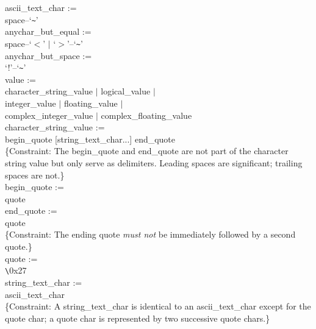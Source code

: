 \documentclass[onecolumn]{aa}
\begin{document}
ascii\_text\_char :=  \\ \null \hspace{0.5in}
	space--`\verb+~+' \\

anychar\_but\_equal :=  \\ \null \hspace{0.5in}
	space--`$<$' $|$ `$>$'--`\verb+~+' \\

anychar\_but\_space :=  \\ \null \hspace{0.5in}
	`!'--`\verb+~+' \\

value :=   \\ \null \hspace{0.5in}
	character\_string\_value $|$ logical\_value $|$ \\ \null \hspace{0.5in}
	integer\_value $|$ floating\_value $|$ \\ \null \hspace{0.5in}
	complex\_integer\_value $|$ complex\_floating\_value \\

character\_string\_value :=   \\ \null \hspace{0.5in}
	begin\_quote [string\_text\_char...] end\_quote \\
\{Constraint: The begin\_quote and end\_quote are not part of the
character string value but only serve as delimiters.  Leading spaces are
significant; trailing spaces are not.\} \\

begin\_quote :=   \\ \null \hspace{0.5in}
	quote \\

end\_quote :=   \\ \null \hspace{0.5in}
	quote \\
\{Constraint: The ending quote {\em must not} be immediately followed by a
second quote.\} \\

quote :=   \\ \null \hspace{0.5in}
	\verb+\+0x27 \\

string\_text\_char :=   \\ \null \hspace{0.5in}
	ascii\_text\_char \\
\{Constraint: A string\_text\_char is identical to an ascii\_text\_char
except for the quote char; a quote char is represented by two successive
quote chars.\} \\
\end{document}
